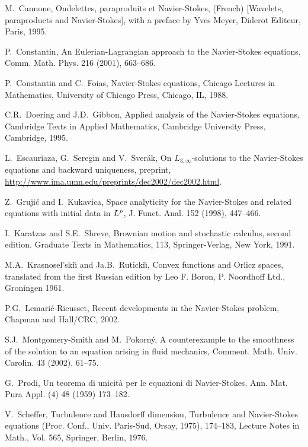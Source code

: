 \documentclass[12pt]{amsart}
\theoremstyle{remark}
\begin{document}
\begin{thebibliography}{999}

M.~Cannone,  Ondelettes, paraproduits et Navier-Stokes, (French) 
[Wavelets, paraproducts and Navier-Stokes], 
with a preface by Yves Meyer, 
Diderot Editeur, Paris, 1995.

P.~Constantin,
An Eulerian-Lagrangian approach to the Navier-Stokes equations, 
Comm. Math. Phys.  216  (2001), 663--686.

P.~Constantin and C.~Foias, 
Navier-Stokes equations, 
Chicago Lectures in Mathematics,
University of Chicago Press, Chicago, IL, 1988.

C.R.~Doering and J.D.~Gibbon,
Applied analysis of the Navier-Stokes equations,
Cambridge Texts in Applied Mathematics,
Cambridge University Press, Cambridge, 1995.

L.~Escauriaza, G.~Seregin and V.~Sver\'ak,
On 
$L_{3,\infty}$-solutions to the Navier-Stokes equations and backward 
uniqueness,
preprint, \url{http://www.ima.umn.edu/preprints/dec2002/dec2002.html}.

Z.~Gruji\'c and I.~Kukavica,
Space analyticity for the Navier-Stokes and related 
equations with initial data in $L\sp p$,
J. Funct. Anal.  152  (1998), 447--466.

I.~Karatzas and S.E.~Shreve,
Brownian motion and stochastic calculus,
second edition. Graduate Texts in Mathematics, 113,
Springer-Verlag, New York, 1991.

M.A.~Krasnosel'ski{\u\i} and Ja.B.~Ruticki\u\i,
Convex functions and Orlicz spaces,
translated from the first Russian edition by Leo F. Boron, 
P. Noordhoff Ltd., 
Groningen 1961.

P.G.~Lemari\'e-Rieusset,
Recent developments in the Navier-Stokes problem,
Chapman and Hall/CRC, 2002.

S.J.~Montgomery-Smith and M.~Pokorn\'y,
A counterexample to the smoothness of the solution to an 
equation arising in fluid mechanics,
Comment. Math. Univ. Carolin.  43  (2002),  61--75.

G.~Prodi,
Un teorema di unicit\`a per le equazioni di Navier-Stokes,
Ann. Mat. Pura Appl. (4)  48  (1959) 173--182.

V.~Scheffer,
Turbulence and Hausdorff dimension, 
Turbulence and Navier-Stokes equations
(Proc. Conf., Univ. Paris-Sud, Orsay, 1975), 174--183,
Lecture Notes in Math., Vol. 565, Springer, Berlin, 1976. 


\end{thebibliography}
\end{document}
